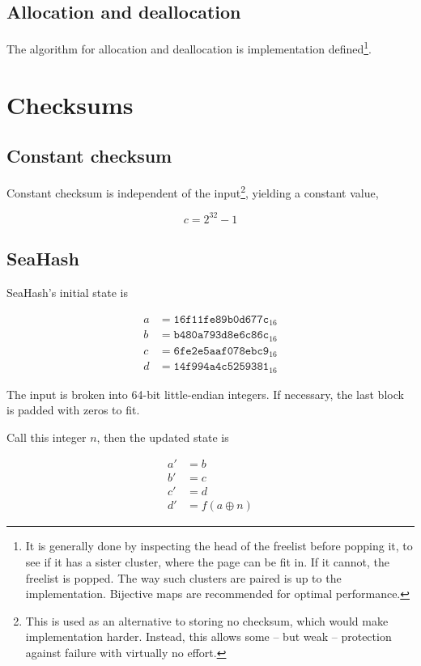 \documentclass[11pt,a4paper]{report}
\begin{document}
        \subsection{Allocation and deallocation}
        The algorithm for allocation and deallocation is implementation
        defined\footnote{It is generally done by inspecting the head of the
            freelist before popping it, to see if it has a sister cluster,
            where the page can be fit in. If it cannot, the freelist is popped.
            The way such clusters are paired is up to the implementation.
            Bijective maps are recommended for optimal performance.}.

    \section{Checksums}
        \subsection{Constant checksum}
        \label{checksum:constant}
        Constant checksum is independent of the input\footnote{This is used as
        an alternative to storing no checksum, which would make implementation
        harder. Instead, this allows some -- but weak -- protection against failure
        with virtually no effort.}, yielding a constant value,

        $$c = 2^{32} - 1$$

        \subsection{SeaHash}
        \label{checksum:seahash}
        SeaHash's initial state is

        \begin{align*}
            a &= \texttt{16f11fe89b0d677c}_{16} \\
            b &= \texttt{b480a793d8e6c86c}_{16} \\
            c &= \texttt{6fe2e5aaf078ebc9}_{16} \\
            d &= \texttt{14f994a4c5259381}_{16}
        \end{align*}

        The input is broken into 64-bit little-endian integers. If necessary,
        the last block is padded with zeros to fit.

        Call this integer $n$, then the updated state is

        \begin{align*}
            a' &= b \\
            b' &= c \\
            c' &= d \\
            d' &= f(a \oplus n)
        \end{align*}
\end{document}
